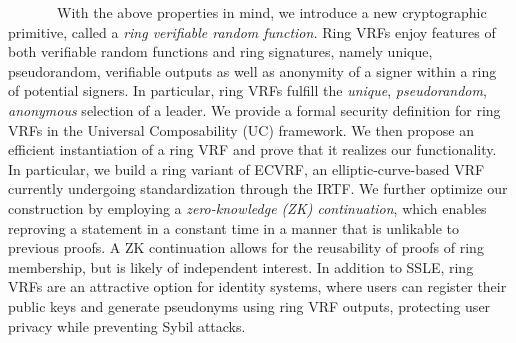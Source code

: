 ~~~~~~~With the above properties in mind, we introduce a new cryptographic primitive, called a 
\emph{ring verifiable random function.}
Ring VRFs enjoy features of both verifiable random functions and ring signatures, namely unique, pseudorandom, verifiable outputs as well as anonymity of a signer within a ring of potential signers.
In particular, ring VRFs fulfill the \emph{unique}, \emph{pseudorandom}, \emph{anonymous} selection of a leader.
We provide a formal security definition for ring VRFs in the Universal Composability (UC) framework.
We then propose an efficient instantiation of a ring VRF and prove that it realizes our functionality.
In particular, we build a ring variant of ECVRF, an elliptic-curve-based VRF currently undergoing standardization through the IRTF.
We further optimize our construction by employing a \emph{zero-knowledge (ZK) continuation}, which enables reproving a statement in a constant time in a manner that is unlikable to previous proofs.
A ZK continuation allows for the reusability of proofs of ring membership, but is likely of independent interest.
In addition to SSLE, ring VRFs are an attractive option for identity systems, where users can register their public keys and generate pseudonyms using ring VRF outputs, protecting user privacy while preventing Sybil attacks.


